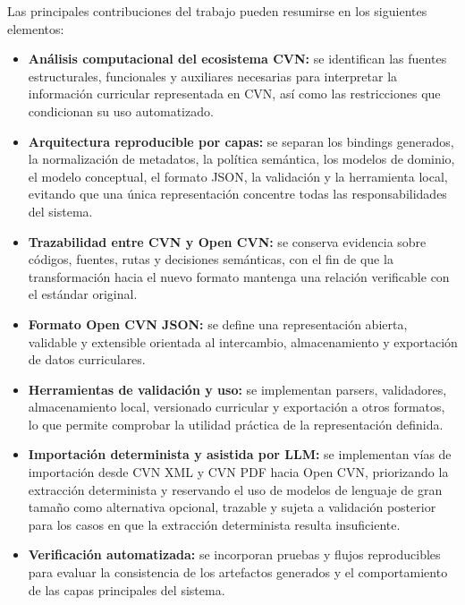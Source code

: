 Las principales contribuciones del trabajo pueden resumirse en los siguientes
elementos:

\begin{itemize}
  \item \textbf{Análisis computacional del ecosistema CVN:} se identifican las
  fuentes estructurales, funcionales y auxiliares necesarias para interpretar la
  información curricular representada en CVN, así como las restricciones que
  condicionan su uso automatizado.

  \item \textbf{Arquitectura reproducible por capas:} se separan los bindings
  generados, la normalización de metadatos, la política semántica, los modelos de
  dominio, el modelo conceptual, el formato JSON, la validación y la herramienta
  local, evitando que una única representación concentre todas las
  responsabilidades del sistema.

  \item \textbf{Trazabilidad entre CVN y Open CVN:} se conserva evidencia sobre
  códigos, fuentes, rutas y decisiones semánticas, con el fin de que la
  transformación hacia el nuevo formato mantenga una relación verificable con el
  estándar original.

  \item \textbf{Formato Open CVN JSON:} se define una representación abierta,
  validable y extensible orientada al intercambio, almacenamiento y exportación de
  datos curriculares.

  \item \textbf{Herramientas de validación y uso:} se implementan parsers,
  validadores, almacenamiento local, versionado curricular y exportación a otros
  formatos, lo que permite comprobar la utilidad práctica de la representación
  definida.

  \item \textbf{Importación determinista y asistida por LLM:} se implementan
  vías de importación desde CVN XML y CVN PDF hacia Open CVN, priorizando la
  extracción determinista y reservando el uso de modelos de lenguaje de gran
  tamaño como alternativa opcional, trazable y sujeta a validación posterior para
  los casos en que la extracción determinista resulta insuficiente.

  \item \textbf{Verificación automatizada:} se incorporan pruebas y flujos
  reproducibles para evaluar la consistencia de los artefactos generados y el
  comportamiento de las capas principales del sistema.
\end{itemize}

